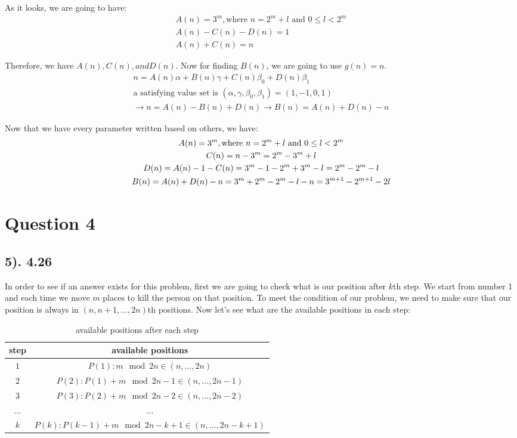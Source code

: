 \documentclass[12pt]{article}
\begin{document}
As it looks, we are going to have:
\begin{gather*}
    A(n) = 3^m, \text{where } n = 2^m + l \text{ and } 0 \leq l < 2^m \\
    A(n) - C(n) - D(n) = 1 \\
    A(n) + C(n) = n
\end{gather*}

Therefore, we have $A(n), C(n), and D(n)$. Now for finding $B(n)$, we are going to use $g(n)=n$.
\begin{gather*}
    n = A(n) \alpha + B(n) \gamma + C(n) \beta_{0} + D(n) \beta_{1} \\
    \text{a satisfying value set is } (\alpha, \gamma, \beta_{0}, \beta_{1}) = (1, -1, 0, 1) \\
    \to n = A(n) - B(n) + D(n) \to B(n) = A(n) + D(n) - n
\end{gather*}

Now that we have every parameter written based on others, we have:
\begin{gather*}
    A(n) = 3^m, \text{where } n = 2^m + l \text{ and } 0 \leq l < 2^m \\
    C(n) = n - 3^m = 2^m - 3^m + l \\
    D(n) = A(n) - 1 - C(n) = 3^m - 1 - 2^m + 3^m - l = 2 \time 3^m - 2^m - l \\
    B(n) = A(n) + D(n) - n = 3^m + 2 \time 3^m - 2^m - l - n = 3^{m+1} - 2^{m+1} -2l
\end{gather*}


\section*{Question 4}
\subsection*{5). 4.26}
In order to see if an answer exists for this problem, first we are going to check what is our position after $k$th step. We start from number 1 and each time we move $m$ places to kill the person on that position.
To meet the condition of our problem, we need to make sure that our position is always in $(n, n+1, \ldots, 2n)$th positions. Now let's see what are the available positions in each step:
\begin{table}[h]
    \centering
    \begin{tabular}{|c|c|}
        \hline
        step & available positions \\
        \hline
        $1$ & $P(1): m \mod 2n \in (n, \ldots, 2n)$ \\
        \hline
        $2$ & $P(2): P(1) + m \mod {2n-1} \in (n, \ldots, 2n-1)$ \\
        \hline
        $3$ & $P(3): P(2) + m \mod {2n-2} \in (n, \ldots, 2n-2)$ \\
        \hline
        $\ldots$ & $\ldots$ \\
        \hline
        $k$ & $P(k): P(k-1) + m \mod {2n-k+1} \in (n, \ldots, 2n-k+1)$ \\
        \hline
    \end{tabular}
    \caption{available positions after each step}
    \label{tab:sample}
\end{table}
\end{document}
